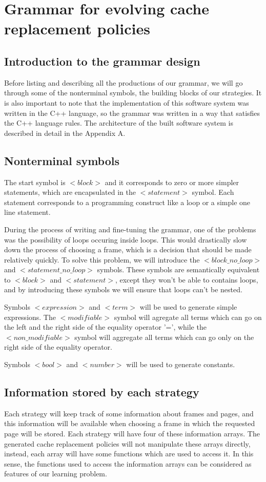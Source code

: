 \section{Grammar for evolving cache replacement policies}
\subsection{Introduction to the grammar design}
Before listing and describing all the productions of our grammar, we will go through some of the nonterminal symbols, the building blocks of our strategies. It is also important to note that the implementation of this software system was written in the C++ language, so the grammar was written in a way that satisfies the C++ language rules. The architecture of the built software system is described in detail in the Appendix A.

\subsection{Nonterminal symbols}
The start symbol is ${<}block{>}$ and it corresponds to zero or more simpler statements, which are encapsulated in the ${<}statement{>}$ symbol. Each statement corresponds to a programming construct like a loop or a simple one line statement.

During the process of writing and fine-tuning the grammar, one of the problems was the possibility of loops occuring inside loops. This would drastically slow down the process of choosing a frame, which is a decision that should be made relatively quickly. To solve this problem, we will introduce the ${<}block\_no\_loop{>}$ and ${<}statement\_no\_loop{>}$ symbols. These symbols are semantically equivalent to ${<}block{>}$ and ${<}statement{>}$, except they won't be able to contains loops, and by introducing these symbols we will ensure that loops can't be nested.

Symbols ${<}expression{>}$ and ${<}term{>}$ will be used to generate simple expressions. The ${<}modifiable{>}$ symbol	 will agregate all terms which can go on the left and the right side of the equality operator '=', while the ${<}non\_modifiable{>}$ symbol will aggregate all terms which can go only on the right side of the equality operator.

Symbols ${<}bool{>}$ and ${<}number{>}$ will be used to generate constants.

\subsection{Information stored by each strategy}
Each strategy will keep track of some information about frames and pages, and this information will be available when choosing a frame in which the requested page will be stored. Each strategy will have four of these information arrays. The generated cache replacement policies will not manipulate these arrays directly, instead, each array will have some functions which are used to access it. In this sense, the functions used to access the information arrays can be considered as features of our learning problem.

